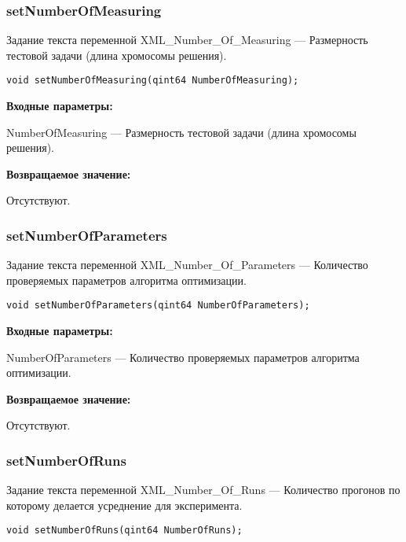 \documentclass[a4paper,12pt]{article}
\begin{document}
\subsubsection{setNumberOfMeasuring}\label{setNumberOfMeasuring}

Задание текста переменной  XML\_Number\_Of\_Measuring --- Размерность тестовой задачи (длина хромосомы решения).


\begin{lstlisting}[label=code_syntax_setNumberOfMeasuring,caption=Синтаксис]
void setNumberOfMeasuring(qint64 NumberOfMeasuring);
\end{lstlisting}

\textbf{Входные параметры:}

NumberOfMeasuring --- Размерность тестовой задачи (длина хромосомы решения).

\textbf{Возвращаемое значение:}

Отсутствуют.


\subsubsection{setNumberOfParameters}\label{setNumberOfParameters}

Задание текста переменной  XML\_Number\_Of\_Parameters --- Количество проверяемых параметров алгоритма оптимизации.


\begin{lstlisting}[label=code_syntax_setNumberOfParameters,caption=Синтаксис]
void setNumberOfParameters(qint64 NumberOfParameters);
\end{lstlisting}

\textbf{Входные параметры:}

NumberOfParameters --- Количество проверяемых параметров алгоритма оптимизации.

\textbf{Возвращаемое значение:}

Отсутствуют.


\subsubsection{setNumberOfRuns}\label{setNumberOfRuns}

Задание текста переменной  XML\_Number\_Of\_Runs --- Количество прогонов по которому делается усреднение для эксперимента.


\begin{lstlisting}[label=code_syntax_setNumberOfRuns,caption=Синтаксис]
void setNumberOfRuns(qint64 NumberOfRuns);
\end{lstlisting}
\end{document}
